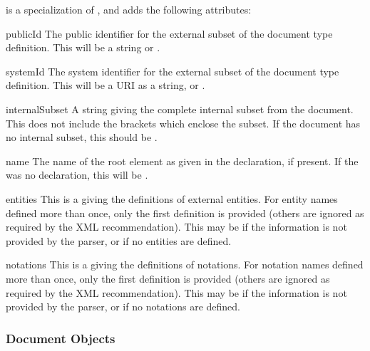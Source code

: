  is a specialization of , and adds the
following attributes:

\begin{memberdesc}[DocumentType]{publicId}
  The public identifier for the external subset of the document type
  definition.  This will be a string or .
\end{memberdesc}

\begin{memberdesc}[DocumentType]{systemId}
  The system identifier for the external subset of the document type
  definition.  This will be a URI as a string, or .
\end{memberdesc}

\begin{memberdesc}[DocumentType]{internalSubset}
  A string giving the complete internal subset from the document.
  This does not include the brackets which enclose the subset.  If the
  document has no internal subset, this should be .
\end{memberdesc}

\begin{memberdesc}[DocumentType]{name}
  The name of the root element as given in the 
  declaration, if present.  If the was no  declaration,
  this will be .
\end{memberdesc}

\begin{memberdesc}[DocumentType]{entities}
  This is a  giving the definitions of external
  entities.  For entity names defined more than once, only the first
  definition is provided (others are ignored as required by the XML
  recommendation).  This may be  if the information is not
  provided by the parser, or if no entities are defined.
\end{memberdesc}

\begin{memberdesc}[DocumentType]{notations}
  This is a  giving the definitions of notations.
  For notation names defined more than once, only the first definition
  is provided (others are ignored as required by the XML
  recommendation).  This may be  if the information is not
  provided by the parser, or if no notations are defined.
\end{memberdesc}


\subsubsection{Document Objects \label{dom-document-objects}}

